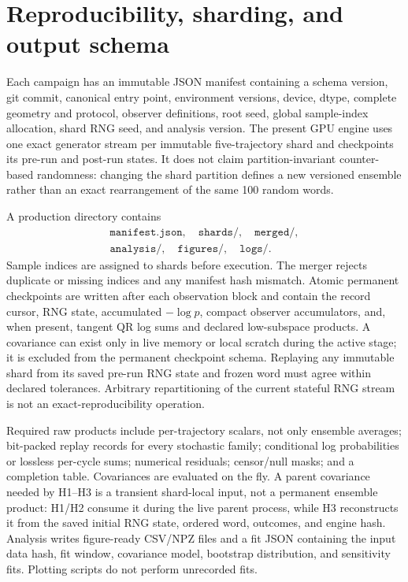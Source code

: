 \documentclass[aps,prx,twocolumn,floatfix,nofootinbib,superscriptaddress,longbibliography]{revtex4-2}
\newcommand{\code}[1]{\texttt{#1}}
\begin{document}
\section{Reproducibility, sharding, and output schema}

Each campaign has an immutable JSON manifest containing a schema version, git commit,
canonical entry point, environment versions, device, dtype, complete geometry and protocol,
observer definitions, root seed, global sample-index allocation, shard RNG seed, and
analysis version.  The present GPU engine uses one exact generator stream per immutable
five-trajectory shard and checkpoints its pre-run and post-run states.  It does not claim
partition-invariant counter-based randomness: changing the shard partition defines a new
versioned ensemble rather than an exact rearrangement of the same 100 random words.

A production directory contains
\begin{equation}
 \begin{gathered}
 \code{manifest.json},\quad \code{shards/},\quad \code{merged/},\\
 \code{analysis/},\quad \code{figures/},\quad \code{logs/}.
 \end{gathered}
\end{equation}
Sample indices are assigned to shards before execution.  The merger rejects duplicate or
missing indices and any manifest hash mismatch.  Atomic permanent checkpoints are written
after each observation block and contain the record cursor, RNG state, accumulated
$-\log p$, compact observer accumulators, and, when present, tangent QR log sums and
declared low-subspace products.  A covariance can exist only in live memory or local
scratch during the active stage; it is excluded from the permanent checkpoint schema.
Replaying any immutable shard from its saved pre-run RNG state and frozen word must agree
within declared tolerances.  Arbitrary repartitioning of the current stateful RNG stream is
not an exact-reproducibility operation.

Required raw products include per-trajectory scalars, not only ensemble averages; bit-packed
replay records for every stochastic family;
conditional log probabilities or lossless per-cycle sums; numerical residuals;
censor/null masks; and a completion table.  Covariances are evaluated on the fly.  A parent
covariance needed by H1--H3 is a transient shard-local input, not a permanent ensemble
product: H1/H2 consume it during the live parent process, while H3 reconstructs it from the
saved initial RNG state, ordered word, outcomes, and engine hash.  Analysis writes
figure-ready CSV/NPZ files and a fit JSON containing the input data hash, fit window,
covariance model, bootstrap distribution, and sensitivity fits.  Plotting scripts do not
perform unrecorded fits.
\end{document}

